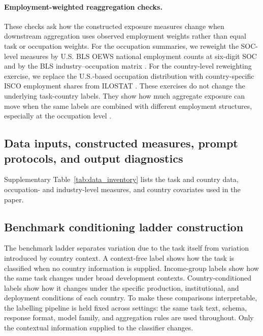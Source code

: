 \documentclass[11pt]{article}
\begin{document}
\paragraph{Employment-weighted reaggregation checks.} These checks ask how the constructed exposure measures change when downstream aggregation uses observed employment weights rather than equal task or occupation weights. For the occupation summaries, we reweight the SOC-level measures by U.S. BLS OEWS national employment counts at six-digit SOC \citep{bls_oes} and by the BLS industry--occupation matrix \citep{bls_industry_occ}. For the country-level reweighting exercise, we replace the U.S.-based occupation distribution with country-specific ISCO employment shares from ILOSTAT \citep{ilostat_database,ILOSTATLabourForceStats2026,ILOSTATProfiles2026}. These exercises do not change the underlying task-country labels. They show how much aggregate exposure can move when the same labels are combined with different employment structures, especially at the occupation level \citep{PizzinelliEtAl2023}.

\FloatBarrier
\subsection{Data inputs, constructed measures, prompt protocols, and output diagnostics}
\label{sec:appendix_measurement_inventory}
Supplementary Table~\ref{tab:data_inventory} lists the task and country data, occupation- and industry-level measures, and country covariates used in the paper.





\FloatBarrier
\subsection{Benchmark conditioning ladder construction}
\label{sec:appendix_benchmark_ladder_method}
The benchmark ladder separates variation due to the task itself from variation introduced by country context. A context-free label shows how the task is classified when no country information is supplied. Income-group labels show how the same task changes under broad development contexts. Country-conditioned labels show how it changes under the specific production, institutional, and deployment conditions of each country. To make these comparisons interpretable, the labelling pipeline is held fixed across settings: the same task text, schema, response format, model family, and aggregation rules are used throughout. Only the contextual information supplied to the classifier changes.
\end{document}
